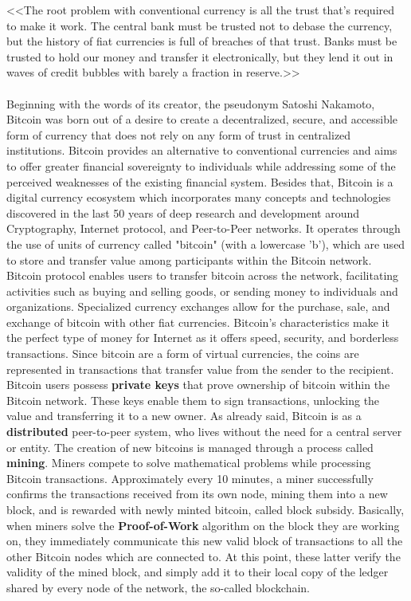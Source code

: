 <<The root problem with conventional currency is all the trust that's required to make it work. The central bank must be trusted not to debase the currency, but the history of fiat currencies is full of breaches of that trust. Banks must be trusted to hold our money and transfer it electronically, but they lend it out in waves of credit bubbles with barely a fraction in reserve.>> \cite{thebookofsatoshi}\\\\
Beginning with the words of its creator, the pseudonym Satoshi Nakamoto, Bitcoin was born out of a desire to create a decentralized, secure, and accessible form of currency that does not rely on any form of trust in centralized institutions. Bitcoin provides an alternative to conventional currencies and aims to offer greater financial sovereignty to individuals while addressing some of the perceived weaknesses of the existing financial system. Besides that, Bitcoin is a digital currency ecosystem which incorporates many concepts and technologies discovered in the last 50 years of deep research and development around Cryptography, Internet protocol, and Peer-to-Peer networks. It operates through the use of units of currency called "bitcoin" (with a lowercase 'b'), which are used to store and transfer value among participants within the Bitcoin network.\\
Bitcoin protocol enables users to transfer bitcoin across the network, facilitating activities such as buying and selling goods, or sending money to individuals and organizations. Specialized currency exchanges allow for the purchase, sale, and exchange of bitcoin with other fiat currencies. Bitcoin's characteristics make it the perfect type of money for Internet as it offers speed, security, and borderless transactions. Since bitcoin are a form of virtual currencies, the coins are represented in transactions that transfer value from the sender to the recipient. Bitcoin users possess \textbf{private keys} that prove ownership of bitcoin within the Bitcoin network. These keys enable them to sign transactions, unlocking the value and transferring it to a new owner. As already said, Bitcoin is as a \textbf{distributed} peer-to-peer system, who lives without the need for a central server or entity. The creation of new bitcoins is managed through a process called \textbf{mining}. Miners compete to solve mathematical problems while processing Bitcoin transactions. Approximately every 10 minutes, a miner successfully confirms the transactions received from its own node, mining them into a new block, and is rewarded with newly minted bitcoin, called block subsidy. Basically, when miners solve the \textbf{Proof-of-Work} algorithm on the block they are working on, they immediately communicate this new valid block of transactions to all the other Bitcoin nodes which are connected to. At this point, these latter verify the validity of the mined block, and simply add it to their local copy of the ledger shared by every node of the network, the so-called blockchain.\\
